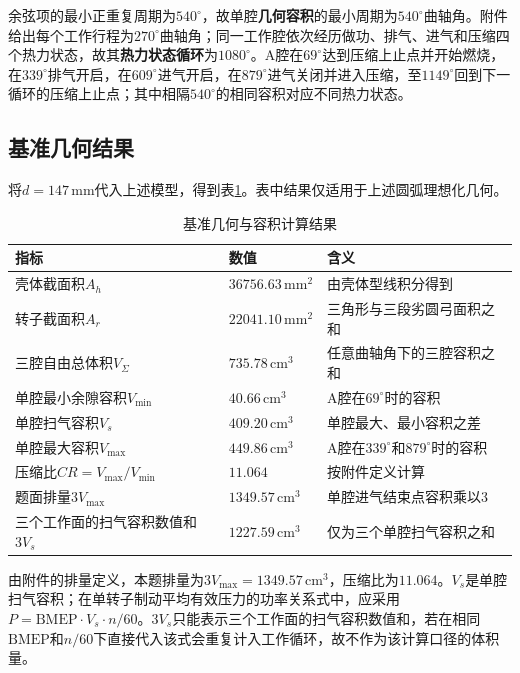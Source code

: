 \documentclass[withoutpreface,bwprint]{cumcmthesis}
\begin{document}
余弦项的最小正重复周期为$540^\circ$，故单腔\textbf{几何容积}的最小周期为$540^\circ$曲轴角。附件给出每个工作行程为$270^\circ$曲轴角；同一工作腔依次经历做功、排气、进气和压缩四个热力状态，故其\textbf{热力状态循环}为$1080^\circ$。A腔在$69^\circ$达到压缩上止点并开始燃烧，在$339^\circ$排气开启，在$609^\circ$进气开启，在$879^\circ$进气关闭并进入压缩，至$1149^\circ$回到下一循环的压缩上止点；其中相隔$540^\circ$的相同容积对应不同热力状态。

\subsection{基准几何结果}

将$d=147\,\mathrm{mm}$代入上述模型，得到表\ref{tab:q1-baseline}。表中结果仅适用于上述圆弧理想化几何。

\begin{table}[H]
\centering
\caption{基准几何与容积计算结果}
\label{tab:q1-baseline}
\begin{tabular}{lll}
\toprule
指标 & 数值 & 含义\\
\midrule
壳体截面积$A_h$ & $36756.63\,\mathrm{mm^2}$ & 由壳体型线积分得到\\
转子截面积$A_r$ & $22041.10\,\mathrm{mm^2}$ & 三角形与三段劣圆弓面积之和\\
三腔自由总体积$V_{\Sigma}$ & $735.78\,\mathrm{cm^3}$ & 任意曲轴角下的三腔容积之和\\
单腔最小余隙容积$V_{\min}$ & $40.66\,\mathrm{cm^3}$ & A腔在$69^\circ$时的容积\\
单腔扫气容积$V_s$ & $409.20\,\mathrm{cm^3}$ & 单腔最大、最小容积之差\\
单腔最大容积$V_{\max}$ & $449.86\,\mathrm{cm^3}$ & A腔在$339^\circ$和$879^\circ$时的容积\\
压缩比$CR=V_{\max}/V_{\min}$ & $11.064$ & 按附件定义计算\\
题面排量$3V_{\max}$ & $1349.57\,\mathrm{cm^3}$ & 单腔进气结束点容积乘以3\\
三个工作面的扫气容积数值和$3V_s$ & $1227.59\,\mathrm{cm^3}$ & 仅为三个单腔扫气容积之和\\
\bottomrule
\end{tabular}
\end{table}

由附件的排量定义，本题排量为$3V_{\max}=1349.57\,\mathrm{cm^3}$，压缩比为$11.064$。$V_s$是单腔扫气容积；在单转子制动平均有效压力的功率关系式中，应采用$P=\mathrm{BMEP}\cdot V_s\cdot n/60$。$3V_s$只能表示三个工作面的扫气容积数值和，若在相同$\mathrm{BMEP}$和$n/60$下直接代入该式会重复计入工作循环，故不作为该计算口径的体积量。
\end{document}
